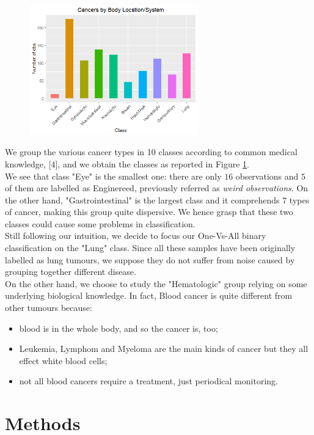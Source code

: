 \documentclass[a4paper,11pt, oneside]{article}  %
\begin{document}
\begin{figure}
	\includegraphics[width=0.65\textwidth]{Rplot-classes.png}
	\label{fig1}
\end{figure}
We group the various cancer types in 10 classes according to common medical knowledge, [4], and we obtain the classes as reported in Figure \ref{fig1}. \\
We see that class "Eye" is the smallest one: there are only $16$ observations and $5$ of them are labelled as Enginereed, previously referred as \textit{weird observations}. On the other hand, "Gastrointestinal" is the largest class and it comprehends $7$ types of cancer, making this group quite dispersive. We hence grasp that these two classes could cause some problems in classification. \\
Still following our intuition, we decide to focus our One-Vs-All binary classification on the "Lung" class. Since all these samples have been originally labelled as lung tumours, we suppose they do not suffer from noise caused by grouping together different disease. \\
On the other hand, we choose to study the "Hematologic" group relying on some underlying biological knowledge. In fact, Blood cancer is quite different from other tumours because:
\begin{itemize}
	\item blood is in the whole body, and so the cancer is, too;
	\item Leukemia, Lymphom and Myeloma are the main kinds of cancer but they all effect white blood cells;
	\item not all blood cancers require a treatment, just periodical monitoring.
\end{itemize} 


\section{Methods}
\end{document}
